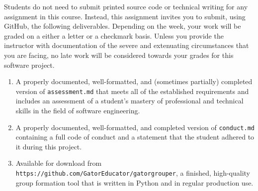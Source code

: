 \documentclass[11pt]{article}
\newcommand{\assessment}{\lstinline{assessment.md}}
\newcommand{\conduct}{\lstinline{conduct.md}}
\newcommand{\url}[1]{\lstinline{#1}}
\begin{document}
\noindent Students do not need to submit printed source code or technical
writing for any assignment in this course. Instead, this assignment invites you
to submit, using GitHub, the following deliverables. Depending on the week, your
work will be graded on a either a letter or a checkmark basis.
%
Unless you provide the instructor with documentation of the severe and
extenuating circumstances that you are facing, no late work will be considered
towards your grades for this software project.

\begin{enumerate}

\setlength{\itemsep}{0in}

\item A properly documented, well-formatted, and (sometimes partially) completed
  version of \assessment{} that meets all of the established requirements and
  includes an assessment of a student's mastery of professional and technical
  skills in the field of software engineering.

\item A properly documented, well-formatted, and completed version of \conduct{}
  containing a full code of conduct and a statement that the student adhered to
  it during this project.

\item Available for download from
  \url{https://github.com/GatorEducator/gatorgrouper}, a finished, high-quality
  group formation tool that is written in Python and in regular production use.

\end{enumerate}
\end{document}
